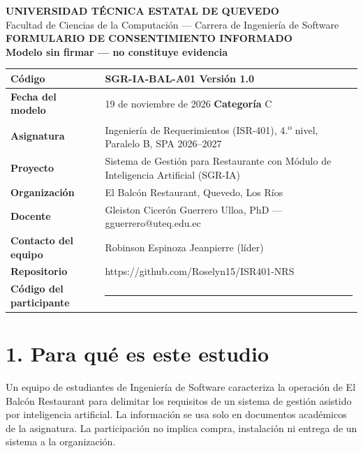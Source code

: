 \documentclass[11pt,a4paper]{article}
\begin{document}
\begin{center}
{\large\textbf{UNIVERSIDAD T\'ECNICA ESTATAL DE QUEVEDO}}\\
Facultad de Ciencias de la Computaci\'on --- Carrera de Ingenier\'ia de Software\\[0.3cm]
\textbf{\Large FORMULARIO DE CONSENTIMIENTO INFORMADO}\\
\textbf{Modelo sin firmar --- no constituye evidencia}
\end{center}

\noindent\begin{tabularx}{\linewidth}{|p{2.8cm}|X|}
\hline
\textbf{C\'odigo} & SGR-IA-BAL-A01 \hfill \textbf{Versi\'on} 1.0\\
\hline
\textbf{Fecha del modelo} & 19 de noviembre de 2026 \hfill \textbf{Categor\'ia} C\\
\hline
\textbf{Asignatura} & Ingenier\'ia de Requerimientos (ISR-401), 4.\textsuperscript{o} nivel, Paralelo B, SPA 2026--2027\\
\hline
\textbf{Proyecto} & Sistema de Gesti\'on para Restaurante con M\'odulo de Inteligencia Artificial (SGR-IA)\\
\hline
\textbf{Organizaci\'on} & El Balcón Restaurant, Quevedo, Los R\'ios\\
\hline
\textbf{Docente} & Gleiston Cicer\'on Guerrero Ulloa, PhD --- gguerrero@uteq.edu.ec\\
\hline
\textbf{Contacto del equipo} & Robinson Espinoza Jeanpierre (l\'ider)\\
\hline
\textbf{Repositorio} & https://github.com/Roselyn15/ISR401-NRS\\
\hline
\textbf{C\'odigo del participante} & \rule{6cm}{0.4pt}\\
\hline
\end{tabularx}

\section*{1. Para qu\'e es este estudio}
Un equipo de estudiantes de Ingenier\'ia de Software caracteriza la operaci\'on de El Balcón Restaurant para delimitar los requisitos de un sistema de gesti\'on asistido por inteligencia artificial. La informaci\'on se usa solo en documentos acad\'emicos de la asignatura. La participaci\'on no implica compra, instalaci\'on ni entrega de un sistema a la organizaci\'on.
\end{document}
